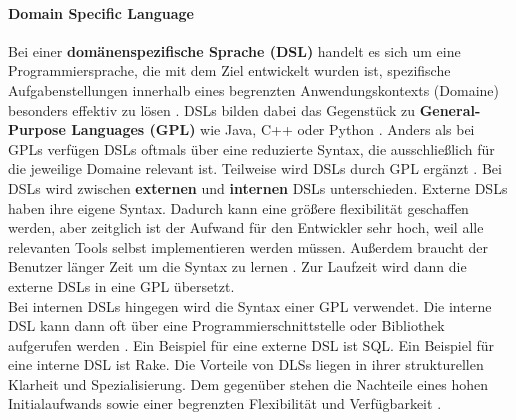     \paragraph{Domain Specific Language}
    Bei einer \textbf{domänenspezifische Sprache (DSL)} handelt es sich um eine Programmiersprache, die mit dem Ziel entwickelt wurden ist, spezifische Aufgabenstellungen innerhalb eines begrenzten Anwendungskontexts (Domaine) besonders effektiv zu lösen \cite{18}.
    DSLs bilden dabei das Gegenstück zu \textbf{General-Purpose Languages (GPL)} wie Java, C++ oder Python \cite{14}.
    Anders als bei GPLs verfügen DSLs oftmals über eine reduzierte Syntax, die ausschließlich für die jeweilige Domaine relevant ist. Teilweise wird DSLs durch GPL ergänzt \cite{18}.
    Bei DSLs wird zwischen \textbf{externen} und \textbf{internen} DSLs unterschieden. Externe DSLs haben ihre eigene Syntax. 
    Dadurch kann eine größere flexibilität geschaffen werden, aber zeitglich ist der Aufwand für den Entwickler sehr hoch, weil alle relevanten Tools selbst implementieren werden müssen. 
    Außerdem braucht der Benutzer länger Zeit um die Syntax zu lernen \cite{7}.
    Zur Laufzeit wird dann die externe DSLs in eine GPL übersetzt.\\
    Bei internen DSLs hingegen wird die Syntax einer GPL verwendet. 
    Die interne DSL kann dann oft über eine Programmierschnittstelle oder Bibliothek aufgerufen werden \cite{14}.
    Ein Beispiel für eine externe DSL ist SQL.
    Ein Beispiel für eine interne DSL ist Rake.
    Die Vorteile von DLSs liegen in ihrer strukturellen Klarheit und Spezialisierung. Dem gegenüber stehen die Nachteile eines hohen Initialaufwands sowie einer begrenzten Flexibilität und Verfügbarkeit \cite{18}.
